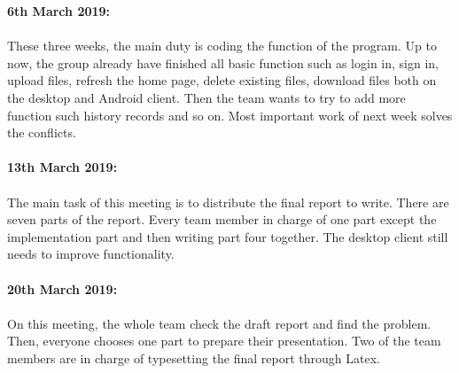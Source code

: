 \documentclass[11pt]{article}
\begin{document}
\textbf{6th March 2019:}
\\
\\
These three weeks, the main duty is coding the function of the program. Up to now, the group already have finished all basic function such as login in, sign in, upload files, refresh the home page, delete existing files, download files both on the desktop and Android client.  Then the team wants to try to add more function such history records and so on. Most important work of next week solves the conflicts.
\\
\\
\textbf{13th March 2019:}
\\
\\
The main task of this meeting is to distribute the final report to write. There are seven parts of the report. Every team member in charge of one part except the implementation part and then writing part four together. The desktop client still needs to improve functionality.
\\
\\
\textbf{20th March 2019:}
\\
\\
On this meeting, the whole team check the draft report and find the problem.
Then, everyone chooses one part to prepare their presentation. Two of the team members are in charge of typesetting the final report through Latex.

\clearpage
\end{document}
